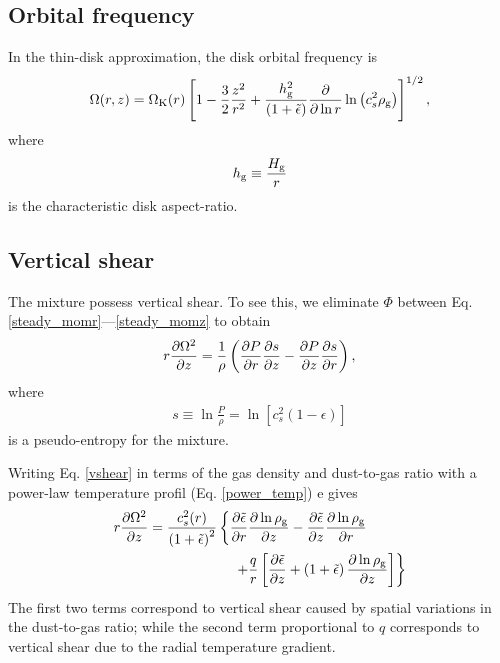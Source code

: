 \subsection{Orbital frequency} 
In the thin-disk approximation, the disk orbital frequency is 
\begin{align}
  \Omega(r,z) = \Omega_{\rm K}(r)\left[1 - \frac{3}{2}\frac{z^2}{r^2} +
    \frac{h_\mathrm{g}^2}{\left(1+\tilde{\epsilon}\right)}\frac{\partial}{\partial\ln{r}}\ln{\left(c_s^2\rho_\mathrm{g}\right)}
    \right]^{1/2}, 
\end{align}
where 
\begin{align}
  h_\mathrm{g} \equiv \frac{H_\mathrm{g}}{r}
\end{align}
is the characteristic disk aspect-ratio. 

\subsection{Vertical shear}
The mixture possess vertical shear. To see this, we eliminate $\Phi$
between Eq. \ref{steady_momr}---\ref{steady_momz} to 
obtain 
\begin{align}\label{vshear}
  r\frac{\partial \Omega^2}{\partial z} 
   = \frac{1}{\rho}\left(\frac{\partial P}{\partial r}\frac{\partial s}{\partial z} -\frac{\partial
    P}{\partial z}\frac{\partial s}{\partial r} \right),
\end{align}
where
\begin{align}
   s \equiv \ln \frac{P}{\rho} = \ln{\left[c_s^2(1-\epsilon)\right]} 
\end{align}
is a pseudo-entropy for the mixture. 

Writing Eq. \ref{vshear} in terms of the gas density and dust-to-gas
ratio with a power-law temperature profil (Eq. \ref{power_temp}) e gives 
\begin{align*}
  &r\frac{\p \Omega^2}{\p z}  =
  \frac{c_s^2(r)}{\left(1+\tepsilon\right)^2}\left\{
  \frac{\p\tepsilon}{\p r}\frac{\p\ln{\rhog}}{\p z}
  -\frac{\p\tepsilon}{\p z}\frac{\p\ln{\rhog}}{\p r}\right.\notag\\
  &\phantom{ r\frac{\p \Omega^2}{\p z}  =
    \frac{c_s^2(r)}{\left(1+\tepsilon\right)^2}\left\{\right\} }
  \left. +\frac{q}{r}\left[\frac{\p\tepsilon}{\p z} + \left(1+\tepsilon\right)\frac{\p\ln{\rhog}}{\p z}\right]
  \right\} 
\end{align*}
The first two terms correspond to vertical shear caused by spatial
variations in the dust-to-gas ratio; while the second term
proportional to $q$ corresponds to vertical shear due to the 
radial temperature gradient.


